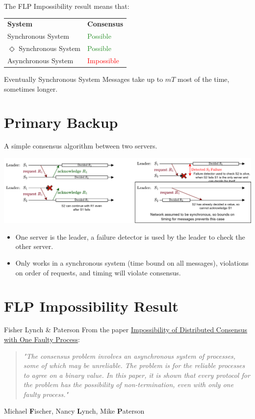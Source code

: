 \noindent The FLP Impossibility result means that:
\begin{center}
    \begin{tabular}{l l}
        \textbf{System} & \textbf{Consensus} \\
        Synchronous System & \textcolor{ForestGreen}{Possible} \\
        $\Diamond$ Synchronous System & \textcolor{ForestGreen}{Possible} \\
        Asynchronous System & \textcolor{red}{Impossible} \\
    \end{tabular}
\end{center}
\begin{definitionbox}{Eventually Synchronous System}
    Messages take up to $mT$ most of the time, sometimes longer. \\ \toimprove
\end{definitionbox}
\section{Primary Backup}
A simple consensus algorithm between two servers.
\begin{center}
    \includegraphics[width=.9\textwidth]{consensus/images/primary_backup_scenarios.drawio.png}
\end{center}
\begin{itemize}
    \item One server is the leader, a failure detector is used by the leader to check the other server.
    \item Only works in a synchronous system (time bound on all messages), violations on order of requests, and timing will violate consensus.
\end{itemize}

\section{FLP Impossibility Result}
\begin{sidenotebox}{Fisher Lynch \& Paterson}
    From the paper \href{https://groups.csail.mit.edu/tds/papers/Lynch/jacm85.pdf}{Impossibility of Distributed Consensus with One Faulty Process}:
    \begin{quote}
        \textit{"The consensus problem involves an asynchronous system of processes, 
        some of which may be unreliable. The problem is for the reliable
        processes to agree on a binary value. In this paper, it is shown that 
        every protocol for the problem has the possibility of non-termination, 
        even with only one faulty process."}
    \end{quote}
    Michael \textbf{F}ischer, Nancy \textbf{L}ynch, Mike \textbf{P}aterson
\end{sidenotebox}


